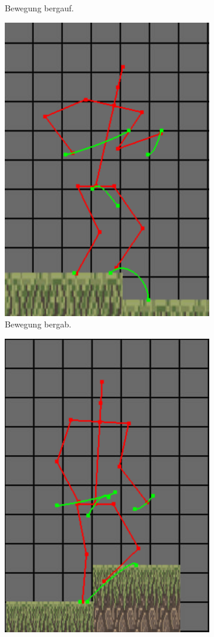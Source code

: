 \begin{figure}
\begin{subfigure}[t]{.4\linewidth}
        \caption{Bewegung bergauf.}
        \label{uphill}
    \end{subfigure}
    \begin{subfigure}[t]{.4\linewidth}
        \centering
        \includegraphics[width=0.75\linewidth]{images/going_down1.png}
        \caption{Bewegung bergab.}
        \label{downhill}
    \end{subfigure}
    \begin{subfigure}[t]{.4\linewidth}
        \centering
        \includegraphics[width=0.75\linewidth]{images/clip_through_gorund.png}

\end{subfigure}
\end{figure}
